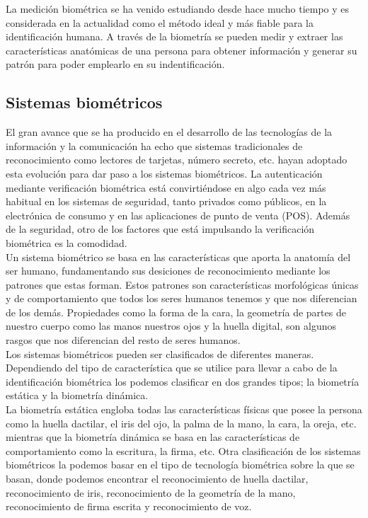 La medición biométrica se ha venido estudiando desde hace mucho tiempo y es considerada en la actualidad como el método ideal y más fiable para la identificación humana. A través de la biometría se pueden medir y extraer las características anatómicas de una persona para obtener información y generar su patrón para poder emplearlo en su indentificación. \\


\subsection{Sistemas biométricos}

El gran avance que se ha producido en el desarrollo de las tecnologías de la información y la comunicación ha echo que sistemas tradicionales de reconocimiento como lectores de tarjetas, número secreto, etc. hayan adoptado esta evolución para dar paso a los sistemas biométricos. La autenticación mediante verificación biométrica está convirtiéndose en algo cada vez más habitual en los sistemas de seguridad, tanto privados como públicos, en la electrónica de consumo y en las aplicaciones de punto de venta (POS). Además de la seguridad, otro de los factores que está impulsando la verificación biométrica es la comodidad. \\

Un sistema biométrico se basa en las características que aporta la anatomía del ser humano, fundamentando sus desiciones de reconocimiento mediante los patrones que estas forman. Estos patrones son características morfológicas únicas y de comportamiento que todos los seres humanos tenemos y que nos diferencian de los demás. Propiedades como la forma de la cara, la geometría de partes de nuestro cuerpo como las manos nuestros ojos y la huella digital, son algunos rasgos que nos diferencian del resto de seres humanos.\\

Los sistemas biométricos pueden ser clasificados de diferentes maneras. Dependiendo del tipo de característica que se utilice para llevar a cabo de la identificación biométrica los podemos clasificar en dos grandes tipos; la biometría estática y la biometría dinámica. \\

La biometría estática engloba todas las características físicas que posee la persona como la huella dactilar, el iris del ojo, la palma de la mano, la cara, la oreja, etc. mientras que la biometría dinámica se basa en las características de comportamiento como la escritura, la firma, etc. 
Otra clasificación de los sistemas biométricos la podemos basar en el tipo de tecnología biométrica sobre la que se basan, donde podemos encontrar el reconocimiento de huella dactilar, reconocimiento de iris, reconocimiento de la geometría de la mano, reconocimiento de firma escrita y reconocimiento de voz.\\

